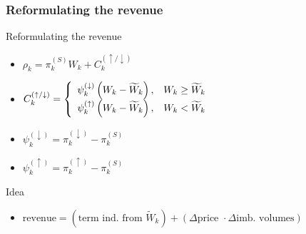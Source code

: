 \begin{frame}\frametitle{Reformulating the revenue}
  \begin{block}{Reformulating the revenue}

  \begin{itemize}
    \item $\rho _ { k } = \pi _ { k } ^ { ( S ) } W _ { k } + C _ { k } ^ { ( \uparrow / \downarrow ) }$
    \item $C _ { k } ^ { ( \uparrow / \downarrow ) } = \left\{ \begin{array} { l l } { \psi _ { k } ^ { ( \downarrow ) } \left( W _ { k } - \widetilde { W } _ { k } \right) , } & { W _ { k } \geq \widetilde { W } _ { k } } \\ { \psi _ { k } ^ { ( \uparrow ) } \left( W _ { k } - \widetilde { W } _ { k } \right) , } & { W _ { k } < \widetilde { W } _ { k } } \end{array} \right.$
    \item $\psi _ { k } ^ { ( \downarrow ) } = \pi _ { k } ^ { ( \downarrow ) } - \pi _ { k } ^ { ( S ) }$
    \item $\psi _ { k } ^ { ( \uparrow ) } = \pi _ { k } ^ { ( \uparrow ) } - \pi _ { k } ^ { ( S ) }$
  \end{itemize}
\end{block}

\begin{block}{Idea}
\begin{itemize}
  \item $\text{revenue} = \left(\text{term ind. from } \widetilde { W } _ { k }\right)
  + \left(\Delta \text{price } \cdot \Delta \text{imb. volumes}\right)$
\end{itemize}
\end{block}

\end{frame}


